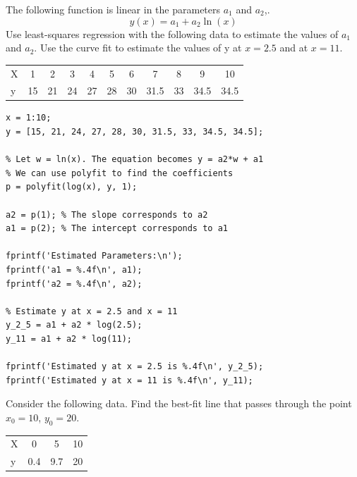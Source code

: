 The following function is linear in the parameters $a_1$ and $a_2$,.
$$y(x) = a_1 + a_2\ln(x)$$
Use least-squares regression with the following data to estimate the values of $a_1$ and $a_2$. Use the curve fit to estimate the values of y at $x=2.5$ and at $x=11$.

\begin{table}[h]
\centering
\begin{tabular}{lcccccccccc}
X & 1 & 2 & 3 & 4 & 5 & 6 & 7 & 8 & 9 & 10 \\
y & 15 & 21 & 24 & 27 & 28 & 30 & 31.5 & 33 & 34.5 & 34.5 \\
\end{tabular}
\end{table}

\begin{lstlisting}
x = 1:10;
y = [15, 21, 24, 27, 28, 30, 31.5, 33, 34.5, 34.5];

% Let w = ln(x). The equation becomes y = a2*w + a1
% We can use polyfit to find the coefficients
p = polyfit(log(x), y, 1);

a2 = p(1); % The slope corresponds to a2
a1 = p(2); % The intercept corresponds to a1

fprintf('Estimated Parameters:\n');
fprintf('a1 = %.4f\n', a1);
fprintf('a2 = %.4f\n', a2);

% Estimate y at x = 2.5 and x = 11
y_2_5 = a1 + a2 * log(2.5);
y_11 = a1 + a2 * log(11);

fprintf('Estimated y at x = 2.5 is %.4f\n', y_2_5);
fprintf('Estimated y at x = 11 is %.4f\n', y_11);
\end{lstlisting}

Consider the following data. Find the best-fit line that passes through the point $x_0 = 10$, $y_0 = 20$.

\begin{table}[h]
\centering
\begin{tabular}{lccc}
X & 0 & 5 & 10 \\
y & 0.4 & 9.7 & 20 \\
\end{tabular}
\end{table}

